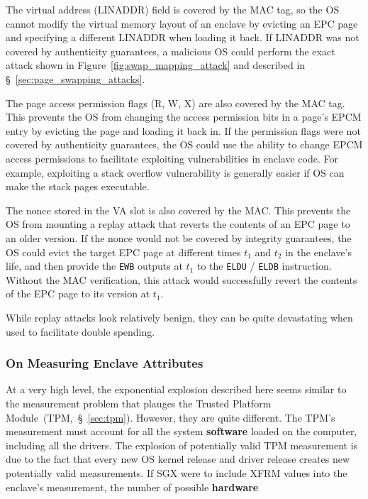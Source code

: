 The virtual address (LINADDR) field is covered by the MAC tag, so the OS cannot
modify the virtual memory layout of an enclave by evicting an EPC page and
specifying a different LINADDR when loading it back. If LINADDR was not covered
by authenticity guarantees, a malicious OS could perform the exact attack shown
in Figure~\ref{fig:swap_mapping_attack} and described in
\S~\ref{sec:page_swapping_attacks}.

The page access permission flags (R, W, X) are also covered by the MAC tag.
This prevents the OS from changing the access permission bits in a page's EPCM
entry by evicting the page and loading it back in. If the permission flags were
not covered by authenticity guarantees, the OS could use the ability to change
EPCM access permissions to facilitate exploiting vulnerabilities in enclave
code. For example, exploiting a stack overflow vulnerability is generally
easier if OS can make the stack pages executable.

The nonce stored in the VA slot is also covered by the MAC. This prevents the
OS from mounting a replay attack that reverts the contents of an EPC page to an
older version. If the nonce would not be covered by integrity guarantees, the
OS could evict the target EPC page at different times $t_1$ and $t_2$ in the
enclave's life, and then provide the \texttt{EWB} outputs at $t_1$ to the
\texttt{ELDU} / \texttt{ELDB} instruction. Without the MAC verification, this
attack would successfully revert the contents of the EPC page to its version
at $t_1$.

While replay attacks look relatively benign, they can be quite devastating when
used to facilitate double spending.


\subsubsection{On Measuring Enclave Attributes}

At a very high level, the exponential explosion described here seems similar to
the measurement problem that plauges the Trusted Platform
Module~(TPM,~\S~\ref{sec:tpm}). However, they are quite different. The TPM's
measurement must account for all the system \textbf{software} loaded on the
computer, including all the drivers. The explosion of potentially valid TPM
measurement is due to the fact that every new OS kernel release and driver
release creates new potentially valid measurements. If SGX were to include XFRM
values into the enclave's measurement, the number of possible \textbf{hardware}



